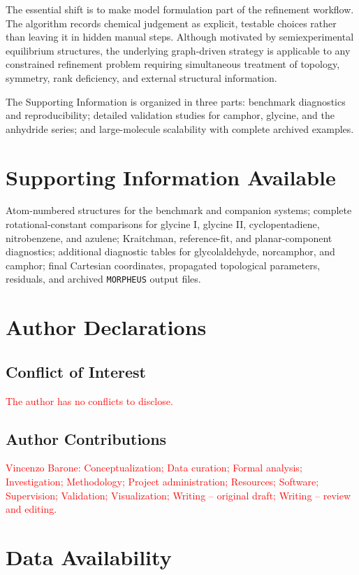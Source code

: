 \documentclass[aip,jcp,reprint,longbibliography,floatfix]{revtex4-2}
\newcommand{\rev}[1]{\textcolor{red}{#1}}
\begin{document}
The essential shift is to make model formulation part of the refinement
workflow. The algorithm records chemical judgement as explicit, testable
choices rather than leaving it in hidden manual steps. Although motivated by
semiexperimental equilibrium structures, the underlying graph-driven strategy
is applicable to any constrained refinement problem requiring simultaneous
treatment of topology, symmetry, rank deficiency, and external structural
information.

The Supporting Information is organized in three parts: benchmark diagnostics
and reproducibility; detailed validation studies for camphor, glycine, and the
anhydride series; and large-molecule scalability with complete archived
examples.

\section*{Supporting Information Available}

Atom-numbered structures for the benchmark and companion systems; complete
rotational-constant comparisons for glycine I, glycine II, cyclopentadiene,
nitrobenzene, and azulene; Kraitchman, reference-fit, and planar-component
diagnostics; additional diagnostic tables for glycolaldehyde, norcamphor, and
camphor; final Cartesian coordinates, propagated topological parameters,
residuals, and archived \texttt{MORPHEUS} output files.

\section*{Author Declarations}

\subsection*{Conflict of Interest}

\rev{The author has no conflicts to disclose.}

\subsection*{Author Contributions}

\rev{Vincenzo Barone: Conceptualization; Data curation; Formal analysis;
Investigation; Methodology; Project administration; Resources; Software;
Supervision; Validation; Visualization; Writing -- original draft; Writing --
review and editing.}

\section*{Data Availability}
\end{document}
